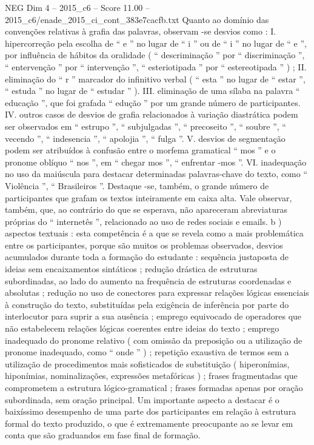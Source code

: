 \begin{textsample}{NEG Dim 4 – 2015\_c6 – Score 11.00 – 2015\_c6/enade\_2015\_ci\_cont\_383e7cacfb.txt}
Quanto ao domínio das convenções relativas à grafia das palavras, observam -se desvios como : I. hipercorreção pela escolha de “ e ” no lugar de “ i ” ou de “ i ” no lugar de “ e ”, por influência de hábitos da oralidade ( “ descriminação ” por “ discriminação ”, “ entervenção ” por “ intervenção ”, “ esteriotipada ” por “ estereotipada ” ) ; II. eliminação do “ r ” marcador do infinitivo verbal ( “ esta ” no lugar de “ estar ”, “ estuda ” no lugar de “ estudar ” ).
III. eliminação de uma sílaba na palavra “ educação ”, que foi grafada “ edução ” por um grande número de participantes.
IV. outros casos de desvios de grafia relacionados à variação diastrática podem ser observados em “ estrupo ”, “ subjulgadas ”, “ precoseito ”, “ soubre ”, “ vecendo ”, “ indesencia ”, “ apolojia ”, “ fulga ”.
V. desvios de segmentação podem ser atribuídos à confusão entre o morfema gramatical “ mos ” e o pronome oblíquo “ nos ”, em “ chegar mos ”, “ enfrentar -mos ”.
VI. inadequação no uso da maiúscula para destacar determinadas palavras-chave do texto, como “ Violência ”, “ Brasileiros ”.
Destaque -se, também, o grande número de participantes que grafam os textos inteiramente em caixa alta.
Vale observar, também, que, ao contrário do que se esperava, não apareceram abreviaturas próprias do “ internetês ”, relacionado ao uso de redes sociais e emails. b ) aspectos textuais : esta competência é a que se revela como a mais problemática entre os participantes, porque são muitos os problemas observados, desvios acumulados durante toda a formação do estudante : sequência justaposta de ideias sem encaixamentos sintáticos ; redução drástica de estruturas subordinadas, ao lado do aumento na frequência de estruturas coordenadas e absolutas ; redução no uso de conectores para expressar relações lógicas essenciais à construção do texto, substituídas pela exigência de inferência por parte do interlocutor para suprir a sua ausência ; emprego equivocado de operadores que não estabelecem relações lógicas coerentes entre ideias do texto ; emprego inadequado do pronome relativo ( com omissão da preposição ou a utilização de pronome inadequado, como “ onde ” ) ; repetição exaustiva de termos sem a utilização de procedimentos mais sofisticados de substituição ( hiperonímias, hiponímias, nominalizações, expressões metafóricas ) ; frases fragmentadas que comprometem a estrutura lógico-gramatical ; frases formadas apenas por oração subordinada, sem oração principal.
Um importante aspecto a destacar é o baixíssimo desempenho de uma parte dos participantes em relação à estrutura formal do texto produzido, o que é extremamente preocupante ao se levar em conta que são graduandos em fase final de formação.

\end{textsample}
